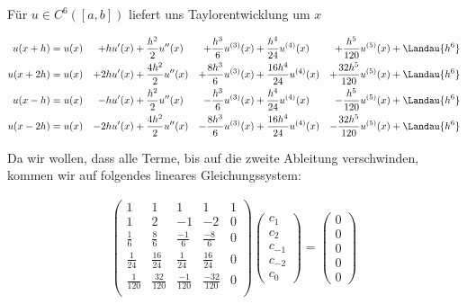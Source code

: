 \begin{solution}
  Für $u \in C^6([a,b])$ liefert uns Taylorentwicklung um $x$

  \begin{align*}
    u(x+h) &= u(x) &+ hu'(x) &+ \frac{h^2}{2}u''(x) &+ \frac{h^3}{6}u^{(3)}(x) &+ \frac{h^4}{24}u^{(4)}(x) &+ \frac{h^5}{120}u^{(5)}(x) &+ \Landau{h^6}\\
    u(x+2h) &= u(x) &+ 2hu'(x) &+ \frac{4h^2}{2}u''(x) &+ \frac{8h^3}{6}u^{(3)}(x) &+ \frac{16h^4}{24}u^{(4)}(x) &+ \frac{32h^5}{120}u^{(5)}(x) &+ \Landau{h^6}\\
    u(x-h) &= u(x) &- hu'(x) &+ \frac{h^2}{2}u''(x) &- \frac{h^3}{6}u^{(3)}(x) &+ \frac{h^4}{24}u^{(4)}(x) &- \frac{h^5}{120}u^{(5)}(x) &+ \Landau{h^6}\\
    u(x-2h) &= u(x) &- 2hu'(x) &+ \frac{4h^2}{2}u''(x) &- \frac{8h^3}{6}u^{(3)}(x) &+ \frac{16h^4}{24}u^{(4)}(x) &- \frac{32h^5}{120}u^{(5)}(x) &+ \Landau{h^6}
  \end{align*}

  Da wir wollen, dass alle Terme, bis auf die zweite Ableitung verschwinden, kommen wir auf folgendes lineares Gleichungssystem:

  \begin{align*}
    \begin{pmatrix}
      1 & 1 & 1 & 1 & 1 \\
      1 & 2 & -1 & -2 & 0 \\
      \frac{1}{6} & \frac{8}{6} & \frac{-1}{6} & \frac{-8}{6} & 0 \\
      \frac{1}{24} & \frac{16}{24} & \frac{1}{24} & \frac{16}{24} & 0 \\
      \frac{1}{120} & \frac{32}{120} & \frac{-1}{120} & \frac{-32}{120} & 0 \\
    \end{pmatrix}
    \begin{pmatrix}
      c_1 \\
      c_2 \\
      c_{-1} \\
      c_{-2} \\
      c_{0}
    \end{pmatrix} =
    \begin{pmatrix}
      0 \\ 0 \\ 0 \\ 0 \\ 0
    \end{pmatrix}
  \end{align*}


\end{solution}
